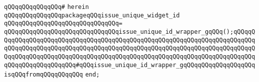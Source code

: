 \verb|qQQqqQQqqQQqqQQq#|\newline
\verb|herein|\newline
\newline
\verb|qQQqqQQqqQQqqQQqpackageqQQqissue_unique_widget_id|\newline
\verb|qQQqqQQqqQQqqQQqqQQqqQQqqQQqqQQq=|\newline
\verb|qQQqqQQqqQQqqQQqqQQqqQQqqQQqqQQqissue_unique_id_wrapper_gqQQq();qQQqqQQqqQQqqQQqqQQqqQQqqQQqqQQqqQQqqQQqqQQqqQQqqQQqqQQqqQQqqQQqqQQqqQQqqQQqqQQqqQQqqQQqqQQqqQQqqQQqqQQqqQQqqQQqqQQqqQQqqQQqqQQqqQQqqQQqqQQqqQQqqQQqqQQqqQQqqQQqqQQqqQQqqQQqqQQqqQQqqQQqqQQqqQQqqQQqqQQqqQQqqQQqqQQqqQQqqQQqqQQqqQQqqQQqqQQq#qQQqissue_unique_id_wrapper_gqQQqqQQqqQQqqQQqqQQqisqQQqfromqQQqqQQqqQQq|\newline
\verb|end;|\newline
\newline
\newline
\newline

